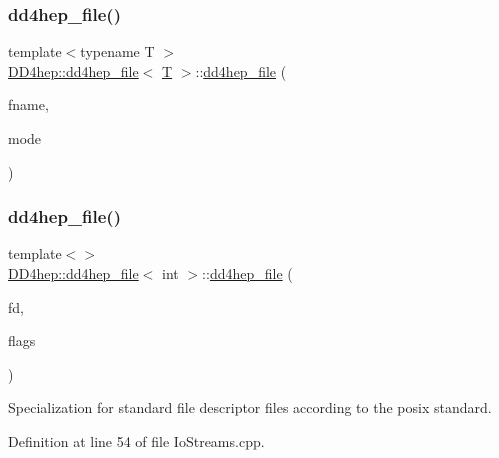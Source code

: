 \subsubsection{\texorpdfstring{dd4hep\+\_\+file()}{dd4hep\_file()}\hspace{0.1cm}{\footnotesize\ttfamily [3/7]}}
{\footnotesize\ttfamily template$<$typename T $>$ \\
\hyperlink{class_d_d4hep_1_1dd4hep__file}{D\+D4hep\+::dd4hep\+\_\+file}$<$ \hyperlink{class_t}{T} $>$\+::\hyperlink{class_d_d4hep_1_1dd4hep__file}{dd4hep\+\_\+file} (\begin{DoxyParamCaption}\item[{const char $\ast$}]{fname,  }\item[{B\+O\+O\+S\+T\+\_\+\+I\+O\+S\+::openmode}]{mode }\end{DoxyParamCaption})}

\hypertarget{class_d_d4hep_1_1dd4hep__file_a3f83e5deac4f7d0bfe20b94d1a87ac7d}{}\label{class_d_d4hep_1_1dd4hep__file_a3f83e5deac4f7d0bfe20b94d1a87ac7d} 
\subsubsection{\texorpdfstring{dd4hep\+\_\+file()}{dd4hep\_file()}\hspace{0.1cm}{\footnotesize\ttfamily [4/7]}}
{\footnotesize\ttfamily template$<$$>$ \\
\hyperlink{class_d_d4hep_1_1dd4hep__file}{D\+D4hep\+::dd4hep\+\_\+file}$<$ int $>$\+::\hyperlink{class_d_d4hep_1_1dd4hep__file}{dd4hep\+\_\+file} (\begin{DoxyParamCaption}\item[{\hyperlink{class_d_d4hep_1_1dd4hep__file_a4d79f8d433cd7831ff818691424cd6fc}{handle\+\_\+type}}]{fd,  }\item[{\hyperlink{namespace_d_d4hep_a31d19f9b0ce567067d2897fbda1761e5}{dd4hep\+\_\+file\+\_\+flags}}]{flags }\end{DoxyParamCaption})}



Specialization for standard file descriptor files according to the posix standard. 



Definition at line 54 of file Io\+Streams.\+cpp.

\hypertarget{class_d_d4hep_1_1dd4hep__file_a5fd6e1774efbf1c77ab299d32d89b2d5}{}\label{class_d_d4hep_1_1dd4hep__file_a5fd6e1774efbf1c77ab299d32d89b2d5} 
